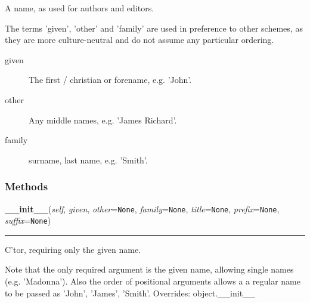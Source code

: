 A name, as used for authors and editors.

The terms 'given', 'other' and 'family' are used in preference to other
schemes, as they are more culture-neutral and do not assume any particular
ordering.
\begin{description}
\item[{given}] \leavevmode 
The first / christian or forename, e.g. 'John'.

\item[{other}] \leavevmode 
Any middle names, e.g. 'James Richard'.

\item[{family}] \leavevmode 
surname, last name, e.g. 'Smith'.

\end{description}


  \subsubsection{Methods}

    \vspace{0.5ex}

\hspace{.8\funcindent}\begin{boxedminipage}{\funcwidth}

    \raggedright \textbf{\_\_init\_\_}(\textit{self}, \textit{given}, \textit{other}={\tt None}, \textit{family}={\tt None}, \textit{title}={\tt None}, \textit{prefix}={\tt None}, \textit{suffix}={\tt None})

    \vspace{-1.5ex}

    \rule{\textwidth}{0.5\fboxrule}
\setlength{\parskip}{2ex}

C'tor, requiring only the given name.

Note that the only required argument is the given name, allowing single
names (e.g. 'Madonna'). Also the order of positional arguments allows a
a regular name to be passed as 'John', 'James', 'Smith'.
\setlength{\parskip}{1ex}
      Overrides: object.\_\_init\_\_

    \end{boxedminipage}

    \vspace{0.5ex}

